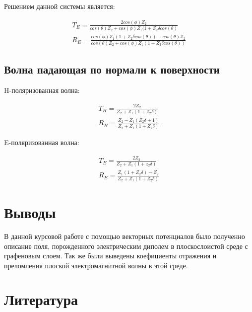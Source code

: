 	Решением данной системы является:
	
	\begin{equation}
		\begin{aligned}
			T_E = \frac{2 cos(\phi ) Z_2}{cos(\theta) Z_2 + cos(\phi) Z_1 (1 + Z_2 \delta cos(\theta)} \\
			R_E = \frac{cos(\phi) Z_1 (1 + Z_2 \delta cos(\theta)) - cos(\theta) Z_2}{cos(\theta) Z_2 + cos(\phi) Z_1 (1 + Z_2 \delta cos(\theta))}
		\end{aligned}
	\end{equation} 
	
	\subsection{Волна падающая по нормали к поверхности} 
	
	H-поляризованная волна:
	
	\begin{equation}
		\begin{aligned}
				T_H = \frac{2  Z_2}{Z_2 + Z_1(1 + Z_2 \delta)} \\
			R_H = \frac{Z_2 - Z_1(Z_2 \delta + 1)}{ Z_2 + Z_1 (1 + Z_2 \delta)} 
		\end{aligned}
	\end{equation}
	
	E-поляризованная волна:
	
	\begin{equation}
		\begin{aligned}
			T_E = \frac{2 Z_2}{Z_2 +  Z_1 (1 + z_2 \delta) } \\
			R_E = \frac{ Z_1 (1 + Z_2 \delta) - Z_2}{ Z_2 +  Z_1 (1 + Z_2 \delta )}
		\end{aligned}
	\end{equation}
	
	
	\section{Выводы}
	
	В данной курсовой работе с помощью векторных потенциалов было полученно описание поля, порожденного электрическим диполем в плоскослоистой среде с графеновым слоем. Так же были выведены коефициенты отражения и преломления плоской электромагнитной волны в этой среде.
	
	\newpage 
	
	\section{Литература}
	
